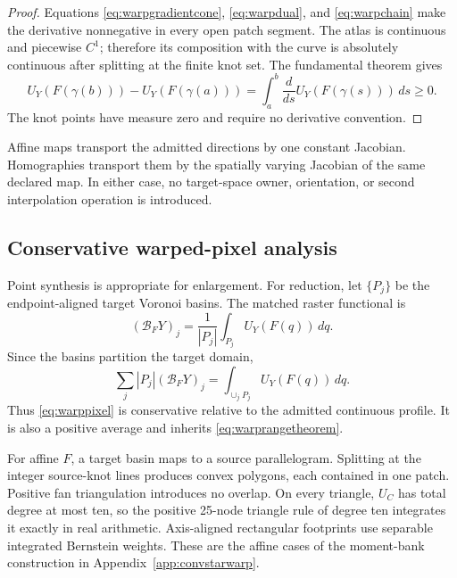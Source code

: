 \begin{proof}
Equations \eqref{eq:warpgradientcone}, \eqref{eq:warpdual}, and
\eqref{eq:warpchain} make the derivative nonnegative in every open patch
segment.  The atlas is continuous and piecewise \(C^1\); therefore its
composition with the curve is absolutely continuous after splitting at the
finite knot set.  The fundamental theorem gives
\begin{equation}
 U_Y(F(\gamma(b)))-U_Y(F(\gamma(a)))
 =\int_a^b\frac{d}{ds}U_Y(F(\gamma(s)))\,ds\geq0.
\end{equation}
The knot points have measure zero and require no derivative convention.
\end{proof}

Affine maps transport the admitted directions by one constant Jacobian.
Homographies transport them by the spatially varying Jacobian of the same
declared map.  In either case, no target-space owner, orientation, or second
interpolation operation is introduced.

\subsection{Conservative warped-pixel analysis}

Point synthesis is appropriate for enlargement.  For reduction, let
\(\{P_j\}\) be the endpoint-aligned target Voronoi basins.  The matched
raster functional is
\begin{equation}
 (\mathcal B_FY)_j=
 \frac{1}{|P_j|}\int_{P_j}U_Y(F(q))\,dq.
 \label{eq:warppixel}
\end{equation}
Since the basins partition the target domain,
\begin{equation}
 \sum_j|P_j|(\mathcal B_FY)_j
 =\int_{\cup_jP_j}U_Y(F(q))\,dq.
 \label{eq:warpconservation}
\end{equation}
Thus \eqref{eq:warppixel} is conservative relative to the admitted continuous
profile.  It is also a positive average and inherits
\eqref{eq:warprangetheorem}.

For affine \(F\), a target basin maps to a source parallelogram. Splitting
at the integer source-knot lines produces convex polygons, each contained in
one patch. Positive fan triangulation introduces no overlap. On every
triangle, \(U_C\) has total degree at most ten, so the positive 25-node
triangle rule of degree ten integrates it exactly in real arithmetic.
Axis-aligned rectangular footprints use separable integrated Bernstein
weights. These are the affine cases of the moment-bank construction in
Appendix~\ref{app:convstarwarp}.

